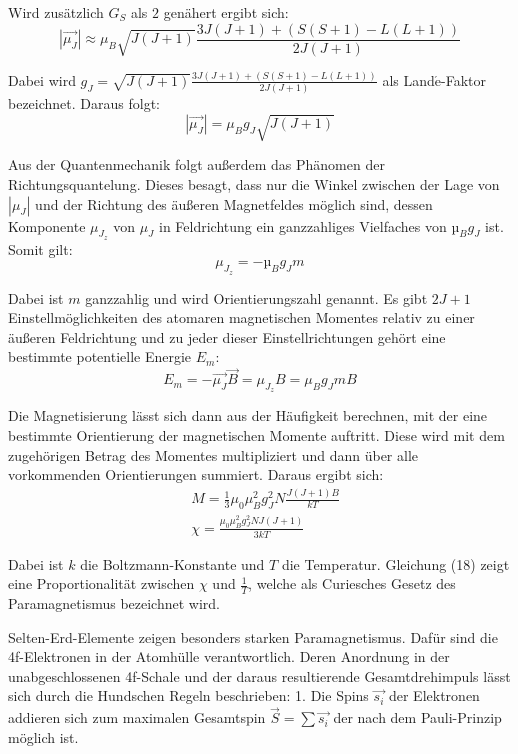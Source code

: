 Wird zusätzlich $G_S$ als $2$ genähert ergibt sich:
\begin{equation}
  |\vec{\mu_J}| \approx \mu_B \sqrt{J(J+1)} \frac{3J(J+1)+ (S(S+1)-L(L+1))}{2J(J+1)}
\end{equation}

Dabei wird $g_J = \sqrt{J(J+1)} \frac{3J(J+1)+ (S(S+1)-L(L+1))}{2J(J+1)}$ als Land$\acute{\text{e}}$-Faktor bezeichnet.
Daraus folgt:
\begin{equation}
  |\vec{\mu_J}| = \mu_B g_J \sqrt{J(J+1)}
\end{equation}

Aus der Quantenmechanik folgt außerdem das Phänomen der Richtungsquantelung. Dieses besagt, dass nur die Winkel
zwischen der Lage von $|\mu_J|$ und der Richtung des äußeren Magnetfeldes möglich sind, dessen Komponente
$\mu_{J_z}$ von $\mu_J$ in Feldrichtung ein ganzzahliges Vielfaches von $µ_B g_J$ ist. Somit gilt:
\begin{equation}
  \mu_{J_z} = - µ_B g_J m
\end{equation}

Dabei ist $m$ ganzzahlig und wird Orientierungszahl genannt. Es gibt $2J + 1$ Einstellmöglichkeiten
des atomaren magnetischen Momentes relativ zu einer äußeren Feldrichtung und zu jeder dieser Einstellrichtungen
gehört eine bestimmte potentielle Energie $E_m$:
\begin{equation}
  E_m = - \vec{\mu_J} \vec{B} = \mu_{J_z} B = \mu_B g_J m B
\end{equation}

Die Magnetisierung lässt sich dann aus der Häufigkeit berechnen, mit der eine bestimmte Orientierung
der magnetischen Momente auftritt. Diese wird mit  dem
zugehörigen Betrag des Momentes multipliziert und dann über alle vorkommenden
Orientierungen summiert. Daraus ergibt sich:
\begin{align}
  &M = \frac{1}{3} \mu_0 \mu_B^2 g_J^2 N \frac{J(J+1)B}{kT} \\
  &\chi = \frac{\mu_0 \mu_B^2 g_J^2 N J(J+1)}{3kT}
\end{align}

Dabei ist $k$ die Boltzmann-Konstante und $T$ die Temperatur. Gleichung (18) zeigt eine
Proportionalität zwischen $\chi$ und $\frac{1}{T}$, welche als Curiesches Gesetz des Paramagnetismus bezeichnet wird.

Selten-Erd-Elemente zeigen besonders starken Paramagnetismus. Dafür sind die 4f-Elektronen in der Atomhülle
verantwortlich. Deren Anordnung in der unabgeschlossenen 4f-Schale und der daraus resultierende Gesamtdrehimpuls
lässt sich durch die Hundschen Regeln beschrieben:
1. Die Spins $\vec{s_i}$ der Elektronen addieren sich zum maximalen Gesamtspin $\vec{S} = \sum \vec{s_i}$ der nach dem Pauli-Prinzip möglich ist.

